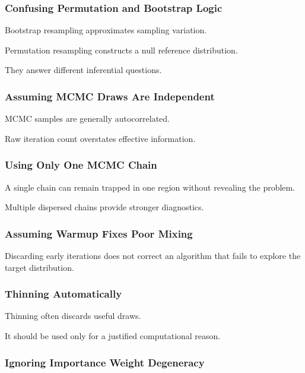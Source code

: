 \subsubsection{Confusing Permutation and Bootstrap Logic}

Bootstrap resampling approximates sampling variation.

Permutation resampling constructs a null reference distribution.

They answer different inferential questions.

\subsubsection{Assuming MCMC Draws Are Independent}

MCMC samples are generally autocorrelated.

Raw iteration count overstates effective information.

\subsubsection{Using Only One MCMC Chain}

A single chain can remain trapped in one region without revealing the
problem.

Multiple dispersed chains provide stronger diagnostics.

\subsubsection{Assuming Warmup Fixes Poor Mixing}

Discarding early iterations does not correct an algorithm that fails to
explore the target distribution.

\subsubsection{Thinning Automatically}

Thinning often discards useful draws.

It should be used only for a justified computational reason.

\subsubsection{Ignoring Importance Weight Degeneracy}

